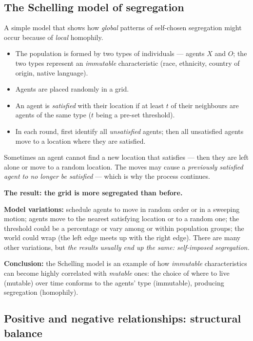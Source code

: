 \documentclass[11pt,a4paper]{article}
\theoremstyle{definition}
\begin{document}
\subsection{The Schelling model of segregation}

\begin{defbox}
A simple model that shows how \emph{global} patterns of self-chosen segregation might occur because of
\emph{local} homophily.
\begin{itemize}
\item The population is formed by two types of individuals --- agents $X$ and $O$; the two types
      represent an \emph{immutable} characteristic (race, ethnicity, country of origin, native
      language).
\item Agents are placed randomly in a grid.
\item An agent is \emph{satisfied} with their location if at least $t$ of their neighbours are agents
      of the same type ($t$ being a pre-set threshold).
\item In each round, first identify all \emph{unsatisfied} agents; then all unsatisfied agents move to
      a location where they are satisfied.
\end{itemize}
Sometimes an agent cannot find a new location that satisfies --- then they are left alone or move to a
random location. The moves may cause a \emph{previously satisfied agent to no longer be satisfied} ---
which is why the process continues.

\textbf{The result: the grid is more segregated than before.}

\textbf{Model variations:} schedule agents to move in random order or in a sweeping motion; agents
move to the nearest satisfying location or to a random one; the threshold could be a percentage or
vary among or within population groups; the world could wrap (the left edge meets up with the right
edge). There are many other variations, but \emph{the results usually end up the same:
self-imposed segregation.}

\textbf{Conclusion:} the Schelling model is an example of how \emph{immutable} characteristics can
become highly correlated with \emph{mutable} ones: the choice of where to live (mutable) over time
conforms to the agents' type (immutable), producing segregation (homophily).
\end{defbox}

\subsection{Positive and negative relationships: structural balance}
\end{document}

